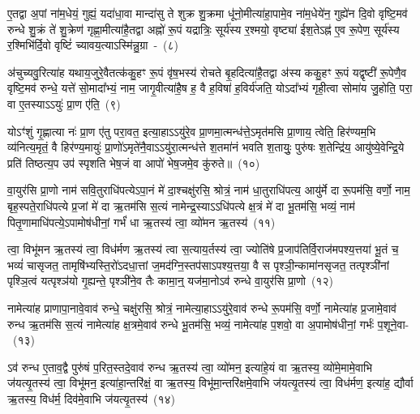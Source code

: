 {\anuvakamend[{शक्व॑रीष्व॒ग्नेर्बृह॒स्पतिः॒ पञ्च॑विꣳशतिश्च}]}%

ए॒तद्वा अ॒पां ना॑म॒धेयं॒ गुह्यं॒ यदा॑धा॒वा मान्दा॑सु ते शुक्र शु॒क्रमा धू॑नो॒मीत्या॑हा॒पामे॒व ना॑म॒धेये॑न॒ गुह्ये॑न दि॒वो वृष्टि॒मव॑ रुन्धे शु॒क्रं ते॑ शु॒क्रेण॑ गृह्णा॒मीत्या॑है॒तद्वा अह्नो॑ रू॒पं यद्रात्रिः॒ सूर्य॑स्य र॒श्मयो॒ वृष्ट्या॑ ईश॒ते\-ऽह्न॑ ए॒व रू॒पेण॒ सूर्य॑स्य र॒श्मिभि॑र्दि॒वो वृष्टिं॑ च्यावय॒त्या\-ऽस्मि॑न्नु॒ग्रा~-~(८)

अ॑चुच्यवु॒रित्या॑ह यथाय॒जुरे॒वैतत्क॑कु॒हꣳ रू॒पं वृ॑ष॒भस्य॑ रोचते बृ॒हदित्या॑है॒तद्वा अ॑स्य ककु॒हꣳ रू॒पं यद्वृष्टी॑ रू॒पेणै॒व वृष्टि॒मव॑ रुन्धे॒ यत्ते॑ सो॒मादा᳚भ्यं॒ नाम॒ जागृ॒वीत्या॑है॒ष ह॒ वै ह॒विषा॑ ह॒विर्य॑जति॒ यो\-ऽ\-दा᳚भ्यं गृही॒त्वा सोमा॑य जु॒होति॒ परा॒ वा ए॒तस्या\-ऽऽ\-युः॑ प्रा॒ण ए॑ति॒~(९)

यो\-ऽꣳ॑शुं गृ॒ह्णात्या नः॑ प्रा॒ण ए॑तु परा॒वत॒ इत्या॒हा\-ऽऽ\-यु॑रे॒व प्रा॒णमा॒त्मन्ध॑त्ते॒\-ऽमृत॑मसि प्रा॒णाय॒ त्वेति॒ हिर॑ण्यम॒भि व्य॑नित्य॒मृतं॒ वै हिर॑ण्य॒मायुः॑ प्रा॒णो॑\-ऽमृते॑नै॒वा\-ऽऽ\-\-यु॑रा॒त्मन्ध॑त्ते श॒तमा॑नं भवति श॒तायुः॒ पुरु॑षः श॒तेन्द्रि॑य॒ आयु॑ष्ये॒वेन्द्रि॒ये प्रति॑ तिष्ठत्य॒प उप॑ स्पृशति भेष॒जं वा आपो॑ भेष॒जमे॒व कु॑रुते॥~(१०)

{\anuvakamend[{उ॒ग्रा ए॒त्याप॒स्त्रीणि॑ च}]}%

वा॒युर॑सि प्रा॒णो नाम॑ सवि॒तुराधि॑पत्ये\-ऽपा॒नं मे॑ दा॒श्चक्षु॑रसि॒ श्रोत्रं॒ नाम॑ धा॒तुराधि॑पत्य॒ आयु॑र्मे दा रू॒पम॑सि॒ वर्णो॒ नाम॒ बृह॒स्पते॒राधि॑पत्ये प्र॒जां मे॑ दा ऋ॒तम॑सि स॒त्यं नामेन्द्र॒स्या\-ऽऽ\-धि॑पत्ये क्ष॒त्रं मे॑ दा भू॒तम॑सि॒ भव्यं॒ नाम॑ पितृ॒णामाधि॑पत्ये॒\-ऽपामोष॑धीनां॒ गर्भं॑ धा ऋ॒तस्य॑ त्वा॒ व्यो॑मन ऋ॒तस्य॑~(११)

त्वा॒ विभू॑मन ऋ॒तस्य॑ त्वा॒ विध॑र्मण ऋ॒तस्य॑ त्वा स॒त्याय॒र्तस्य॑ त्वा॒ ज्योति॑षे प्र॒जा\-प॑तिर्वि॒राज॑मपश्य॒त्तया॑ भू॒तं च॒ भव्यं॑ चासृजत॒ तामृषि॑भ्यस्ति॒रो॑\-ऽदधा॒त्तां ज॒मद॑ग्नि॒स्तप॑सा\-ऽपश्य॒त्तया॒ वै स पृश्ञी॒न्कामा॑नसृजत॒ तत्पृश्ञी॑नां पृश्ञि॒त्वं यत्पृश्ञ॑यो गृ॒ह्यन्ते॒ पृश्ञी॑ने॒व तैः कामा॒न्॒ यज॑मा॒नो\-ऽव॑ रुन्धे वा॒युर॑सि प्रा॒णो~(१२)

नामेत्या॑ह प्राणापा॒नावे॒वाव॑ रुन्धे॒ चक्षु॑रसि॒ श्रोत्रं॒ नामेत्या॒हा\-ऽऽ\-यु॑रे॒वाव॑ रुन्धे रू॒पम॑सि॒ वर्णो॒ नामेत्या॑ह प्र॒जामे॒वाव॑ रुन्ध ऋ॒तम॑सि स॒त्यं नामेत्या॑ह क्ष॒त्रमे॒वाव॑ रुन्धे भू॒तम॑सि॒ भव्यं॒ नामेत्या॑ह प॒शवो॒ वा अ॒पामोष॑धीनां॒ गर्भः॑ प॒शूने॒वा-~(१३)

ऽव॑ रुन्ध ए॒ताव॒द्वै पुरु॑षं प॒रित॒स्तदे॒वाव॑ रुन्ध ऋ॒तस्य॑ त्वा॒ व्यो॑मन॒ इत्या॑हे॒यं वा ऋ॒तस्य॒ व्यो॑मे॒मामे॒वाभि ज॑यत्यृ॒तस्य॑ त्वा॒ विभू॑मन॒ इत्या॑हा॒न्तरि॑क्षं॒ वा ऋ॒तस्य॒ विभू॑मा॒न्तरि॑क्षमे॒वाभि ज॑यत्यृ॒तस्य॑ त्वा॒ विध॑र्मण॒ इत्या॑ह॒ द्यौर्वा ऋ॒तस्य॒ विध॑र्म॒ दिव॑मे॒वाभि ज॑यत्यृ॒तस्य॑~(१४)

